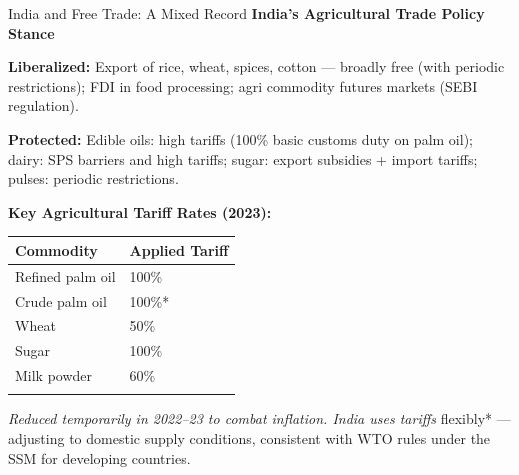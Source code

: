 \documentclass[
  ignorenonframetext,
  aspectratio=169,
]{beamer}
\makeatletter
\let\quarto@originallabel\label
\DeclareRobustCommand*{\label}[1]{\quarto@originallabel{#1}}
\makeatother
\begin{document}
\begin{frame}{India and Free Trade: A Mixed Record}
\label{india-and-free-trade-a-mixed-record}
\textbf{India's Agricultural Trade Policy Stance}

\textbf{Liberalized:} Export of rice, wheat, spices, cotton --- broadly
free (with periodic restrictions); FDI in food processing; agri
commodity futures markets (SEBI regulation).

\textbf{Protected:} Edible oils: high tariffs (100\% basic customs duty
on palm oil); dairy: SPS barriers and high tariffs; sugar: export
subsidies + import tariffs; pulses: periodic restrictions.

\textbf{Key Agricultural Tariff Rates (2023):}

\begin{longtable}[]{@{}ll@{}}
\toprule\noalign{}
Commodity & Applied Tariff \\
\midrule\noalign{}
\endhead
Refined palm oil & 100\% \\
Crude palm oil & 100\%* \\
Wheat & 50\% \\
Sugar & 100\% \\
Milk powder & 60\% \\
\bottomrule\noalign{}
\end{longtable}

\emph{Reduced temporarily in 2022--23 to combat inflation. India uses
tariffs }flexibly* --- adjusting to domestic supply conditions,
consistent with WTO rules under the SSM for developing countries.
\end{frame}
\end{document}

